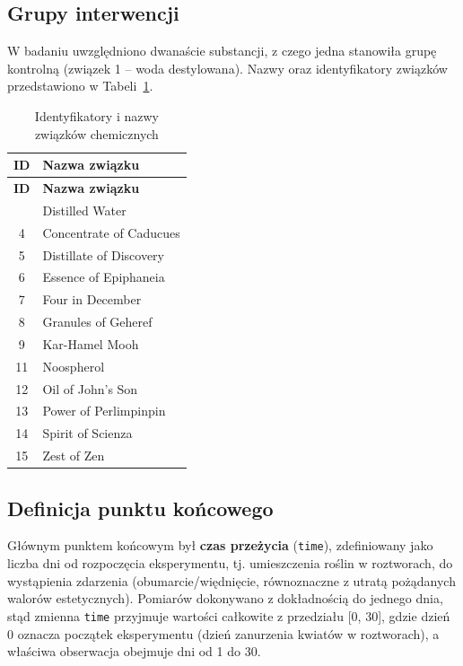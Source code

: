 \documentclass[12pt, a4paper]{article}
\begin{document}
\subsection{Grupy interwencji}
W badaniu uwzględniono dwanaście substancji, z czego jedna stanowiła grupę kontrolną (związek 1 -- woda destylowana). Nazwy oraz identyfikatory związków przedstawiono w Tabeli~\ref{tab:compounds}. 

\begin{longtable}{cl}
\caption{Identyfikatory i nazwy związków chemicznych}
\label{tab:compounds}\\
\toprule
\textbf{ID} & \textbf{Nazwa związku} \\
\midrule
\endfirsthead
\toprule
\textbf{ID} & \textbf{Nazwa związku}  \\
\midrule
\endhead
\bottomrule
\endfoot
1  & Distilled Water           \\
4  & Concentrate of Caducues   \\
5  & Distillate of Discovery   \\
6  & Essence of Epiphaneia     \\
7  & Four in December          \\
8  & Granules of Geheref       \\
9  & Kar-Hamel Mooh            \\
11 & Noospherol                \\
12 & Oil of John's Son         \\
13 & Power of Perlimpinpin     \\
14 & Spirit of Scienza         \\
15 & Zest of Zen               \\
\end{longtable}

\subsection{Definicja punktu końcowego}
Głównym punktem końcowym był \textbf{czas przeżycia} (\texttt{time}), zdefiniowany jako liczba dni od rozpoczęcia eksperymentu, tj. umieszczenia roślin w roztworach, do wystąpienia zdarzenia (obumarcie/więdnięcie, równoznaczne z utratą pożądanych walorów estetycznych). Pomiarów dokonywano z dokładnością do jednego dnia, stąd zmienna \texttt{time} przyjmuje wartości całkowite z przedziału [0, 30], gdzie dzień 0 oznacza początek eksperymentu (dzień zanurzenia kwiatów w roztworach), a właściwa obserwacja obejmuje dni od 1 do 30.
\end{document}
